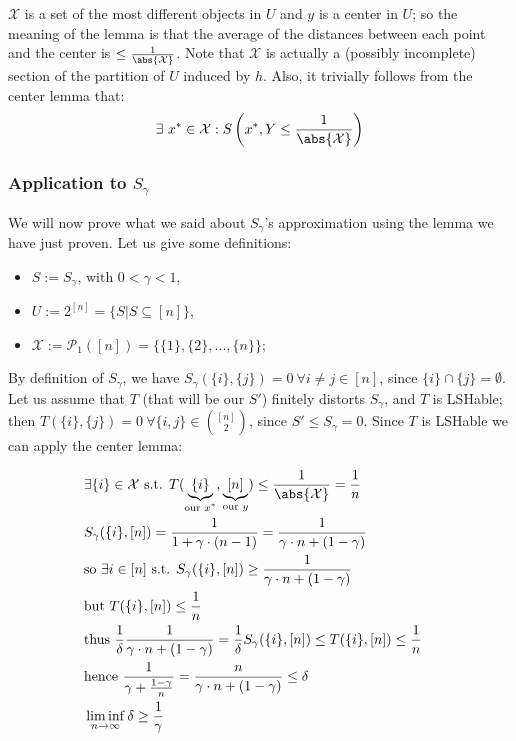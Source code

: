 $\mathcal{X}$ is a set of the most different objects in $U$ and $y$ is a center in $U$; so the meaning of the lemma is that the average of the distances between each point and the center is $\leq \frac{1}{\abs{\mathcal{X}}}$. Note that $\mathcal{X}$ is actually a (possibly incomplete) section of the partition of $U$ induced by $h$. Also, it trivially follows from the center lemma that:
\[
	\exists \ x^* \in \mathcal{X} : S\left(x^*, Y \leq \frac{1}{\abs{\mathcal{X}}}\right)
\]


\subsubsection{Application to $S_\gamma$}
	
We will now prove what we said about $S_\gamma$'s approximation using the lemma we have just proven. Let us give some definitions:

\begin{itemize}
	\item $S := S_\gamma \text{, with } 0 < \gamma < 1$,
	\item $U := 2^{[n]}=\{S|S\subseteq [n]\}$,  %
	\item $\mathcal{X} := \mathcal{P}_1([n])=\{ \{1\}, \{2\}, ..., \{n\} \}$;
\end{itemize}

By definition of $S_\gamma$, we have $S_\gamma(\{i\},\{j\}) = 0 \ \forall i \neq j \in [n]$, since $\{i\} \cap \{j\} = \emptyset$. Let us assume that $T$ (that will be our $S'$) finitely distorts $S_\gamma$, and $T$ is LSHable; then $T(\{i\},\{j\}) = 0 \ \forall \{i, j\} \in \binom{[n]}{2}$, since $S' \leq S_\gamma = 0$. Since $T$ is LSHable we can apply the center lemma:

\begin{align*}
	& \exists \{i\} \in \mathcal{X} \text{ s.t. } T(\underbrace{\{i\}}_\text{our $x^*$}, \underbrace{[n]}_\text{our $y$}) \leq \frac{1}{\abs{\mathcal{X}}} = \frac{1}{n} &&\\
	& S_\gamma(\{i\}, [n]) = \frac{1}{1 + \gamma \cdot (n-1)} = \frac{1}{\gamma \cdot n + (1-\gamma)} &&\\
	& \text{so } \exists i \in [n] \text{ s.t. } S_\gamma(\{i\}, [n]) \geq \frac{1}{\gamma \cdot n + (1-\gamma)} &&\\
	& \text{but } T(\{i\}, [n]) \leq \frac{1}{n} &&\\
	& \text{thus } \frac{1}{\delta} \frac{1}{\gamma \cdot n + (1-\gamma)} = \frac{1}{\delta} S_\gamma(\{i\}, [n]) \leq T(\{i\}, [n]) \leq \frac{1}{n} &&\\
	& \text{hence } \frac{1}{\gamma + \frac{1-\gamma}{n}} = \frac{n}{\gamma \cdot n + (1-\gamma)} \leq \delta &&\\
	& \liminf_{n \to \infty} \delta \geq \frac{1}{\gamma} &&
\end{align*}

